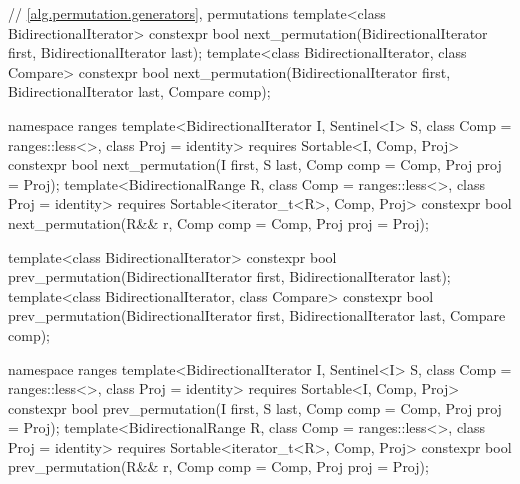 \begin{codeblock}
  // \ref{alg.permutation.generators}, permutations
  template<class BidirectionalIterator>
    constexpr bool next_permutation(BidirectionalIterator first,
                                    BidirectionalIterator last);
  template<class BidirectionalIterator, class Compare>
    constexpr bool next_permutation(BidirectionalIterator first,
                                    BidirectionalIterator last, Compare comp);
\end{codeblock}\begin{addedblock}\begin{codeblock}
  namespace ranges {
    template<BidirectionalIterator I, Sentinel<I> S, class Comp = ranges::less<>,
        class Proj = identity>
      requires Sortable<I, Comp, Proj>
      constexpr bool
        next_permutation(I first, S last, Comp comp = Comp{}, Proj proj = Proj{});
    template<BidirectionalRange R, class Comp = ranges::less<>,
        class Proj = identity>
      requires Sortable<iterator_t<R>, Comp, Proj>
      constexpr bool
        next_permutation(R&& r, Comp comp = Comp{}, Proj proj = Proj{});
  }
\end{codeblock}\end{addedblock}\begin{codeblock}
  template<class BidirectionalIterator>
    constexpr bool prev_permutation(BidirectionalIterator first,
                                    BidirectionalIterator last);
  template<class BidirectionalIterator, class Compare>
    constexpr bool prev_permutation(BidirectionalIterator first,
                                    BidirectionalIterator last, Compare comp);
\end{codeblock}\begin{addedblock}\begin{codeblock}
  namespace ranges {
    template<BidirectionalIterator I, Sentinel<I> S, class Comp = ranges::less<>,
        class Proj = identity>
      requires Sortable<I, Comp, Proj>
      constexpr bool
        prev_permutation(I first, S last, Comp comp = Comp{}, Proj proj = Proj{});
    template<BidirectionalRange R, class Comp = ranges::less<>,
        class Proj = identity>
      requires Sortable<iterator_t<R>, Comp, Proj>
      constexpr bool
        prev_permutation(R&& r, Comp comp = Comp{}, Proj proj = Proj{});
  }
\end{codeblock}\end{addedblock}\begin{codeblock}
}
\end{codeblock}

